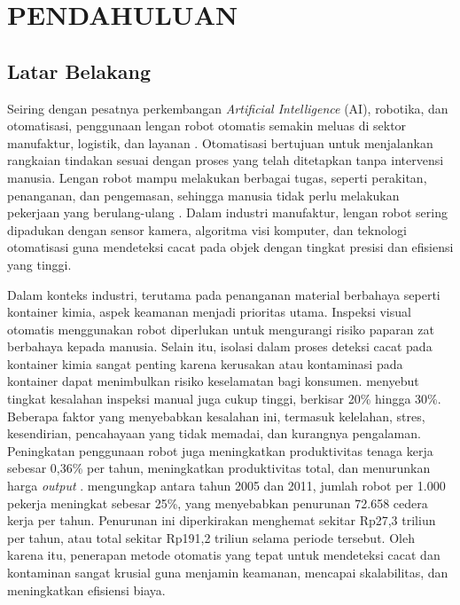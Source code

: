 \chapter{PENDAHULUAN}
\section{Latar Belakang}
Seiring dengan pesatnya perkembangan \textit{Artificial Intelligence} (AI),
robotika, dan otomatisasi, penggunaan lengan robot otomatis semakin
meluas di sektor manufaktur, logistik, dan layanan \citep{1}. Otomatisasi
bertujuan untuk menjalankan rangkaian tindakan sesuai dengan proses
yang telah ditetapkan tanpa intervensi manusia\citep{2}. Lengan robot
mampu melakukan
berbagai tugas, seperti perakitan, penanganan, dan pengemasan,
sehingga manusia tidak perlu melakukan pekerjaan yang
berulang-ulang \citep{3}. Dalam industri manufaktur, lengan robot sering
dipadukan dengan sensor kamera, algoritma visi komputer, dan
teknologi otomatisasi guna mendeteksi cacat pada objek dengan tingkat
presisi dan efisiensi yang tinggi.

Dalam konteks industri, terutama pada penanganan material berbahaya
seperti kontainer kimia, aspek keamanan menjadi prioritas utama.
Inspeksi visual otomatis menggunakan robot diperlukan untuk
mengurangi risiko paparan zat berbahaya kepada manusia. Selain itu,
isolasi dalam proses deteksi cacat pada kontainer kimia sangat
penting karena kerusakan atau kontaminasi pada kontainer dapat
menimbulkan risiko keselamatan bagi konsumen. \citet{4} menyebut
tingkat kesalahan
inspeksi manual juga cukup tinggi, berkisar 20\% hingga 30\%.
Beberapa faktor yang menyebabkan kesalahan ini, termasuk kelelahan,
stres, kesendirian, pencahayaan yang tidak memadai, dan kurangnya
pengalaman. Peningkatan penggunaan robot juga meningkatkan
produktivitas tenaga kerja sebesar 0,36\% per tahun, meningkatkan
produktivitas total, dan menurunkan harga \textit{output} \citep{5}. \citet{6}
mengungkap antara tahun 2005 dan 2011, jumlah robot per 1.000
pekerja meningkat sebesar 25\%, yang menyebabkan penurunan 72.658
cedera kerja per tahun. Penurunan ini diperkirakan menghemat
sekitar Rp27,3 triliun per tahun, atau total sekitar Rp191,2
triliun selama periode tersebut. Oleh
karena itu, penerapan metode otomatis yang tepat untuk mendeteksi
cacat dan kontaminan sangat krusial guna menjamin keamanan, mencapai
skalabilitas, dan meningkatkan efisiensi biaya.

